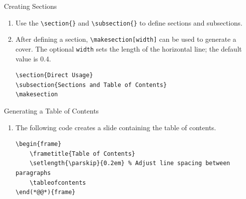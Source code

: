 \documentclass[8pt]{beamer}
\begin{document}
\begin{frame}[fragile]{\insertsection}{\insertsubsection}

    \begin{block}{Creating Sections}
        \begin{enumerate}
            \item Use the \lstinline|\section{}| and \lstinline|\subsection{}| to define sections and subsections.
            \item After defining a section, \lstinline|\makesection[width]| can be used to generate a cover. The optional \lstinline|width| sets the length of the horizontal line; the default value is 0.4.
            \begin{lstlisting}[style=latex]
\section{Direct Usage}
\subsection{Sections and Table of Contents}
\makesection
            \end{lstlisting}
        \end{enumerate}
    \end{block}
    \vspace{-3mm}
    \begin{block}{Generating a Table of Contents}
        \begin{enumerate}
            \item The following code creates a slide containing the table of contents.
            \begin{lstlisting}[style=latex]
\begin{frame}
    \frametitle{Table of Contents}
    \setlength{\parskip}{0.2em} % Adjust line spacing between paragraphs
    \tableofcontents
\end(*@@*){frame}
            \end{lstlisting}
        \end{enumerate}
    \end{block}

\end{frame}
\end{document}
